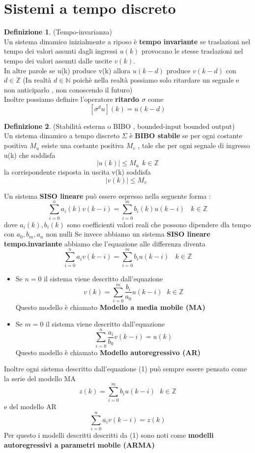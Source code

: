 \documentclass{article}
\theoremstyle{definition}
\newtheorem*{definizione}{Definizione}
\newcommand{\sisdiscr}{\sum_{i=0}^n a_iv(k-i)=\sum_{i=0}^m b_iu(k-i) \ \ \ \ k \in \mathbb{Z}}
\begin{document}
	\section{Sistemi a tempo discreto}
	\begin{definizione}(Tempo-invarianza)\\
		Un sistema dinamico inizialmente a riposo è \textbf{tempo invariante} se traslazioni nel tempo dei valori assunti dagli ingressi $u(k)$ provocano le stesse traslazioni nel tempo dei valori assunti dalle uscite $v(k)$.\\
		In altre parole se u(k) produce v(k) allora $u(k-d)$ produce $v(k-d)$ con $d \in \mathbb{Z}$ (In realtà $d \in \mathbb{N}$ poichè nella realtà possiamo solo ritardare un segnale e non anticiparlo , non conoscendo il futuro)\\
		Inoltre possiamo definire l'operatore \textbf{ritardo $\sigma$ } come 
		$$[\sigma^d u](k)=u(k-d)$$
			\end{definizione}
	\begin{definizione}(Stabilità esterna o BIBO , bounded-input bounded output)\\
		Un sistema dinamico a tempo discreto $\Sigma$ è \textbf{BIBO stabile }se per ogni costante positiva $M_u$ esiste una costante positiva $M_v$ , tale che per ogni segnale di ingresso u(k) che soddisfa 
		$$|u(k)|\leq M_u \ \  k \in \mathbb{Z}$$
		la corrispondente risposta in uscita v(k) soddisfa
		$$|v(k)|\leq M_v \ \  \textbf{} $$
	\end{definizione}
	Un sistema \textbf{SISO lineare} può essere espresso nella seguente forma : 
	$$\sum_{i=0}^n a_i(k)v(k-i)=\sum_{i=0}^m b_i(k)u(k-i) \ \ \ \ k \in \mathbb{Z}$$
	dove $a_i(k),b_i(k)$ sono coefficienti  valori reali che possono dipendere dla tempo con $a_0,b_m,a_n$ non nulli
	Se invece abbiamo un sistema \textbf{SISO lineare tempo.invariante} abbiamo che l'equazione alle differenza diventa 
	\begin{equation}
		\sisdiscr
	\end{equation}
	\begin{itemize}
		\item Se $n=0$ il sistema viene descritto dall'equazione 
		$$v(k)=\sum_{i=0}^{m}\frac{b_i}{a_0}u(k-i)  \ \ \ k \in \mathbb{Z}$$
		Questo modello è chiamato \textbf{Modello a media mobile (MA)}
		\item Se $m=0$ il sistema viene descritto dall'equazione
		$$\sum_{i=0}^{n}\frac{a_i}{b_0}v(k-i)=u(k)$$
		Questo modello è chiamato \textbf{Modello autoregressivo (AR)}
	\end{itemize}
	Inoltre ogni sistema descritto dall'equazione (1) può sempre essere pensato come la serie del modello MA 
	$$z(k)=\sum_{i=0}^{m}b_i u(k-i) \ \ \ k \in \mathbb{Z}$$
	e del modello AR
	$$\sum_{i=0}^{n}a_iv(k-i)=z(k)$$
	Per questo i modelli descritti descritti  da (1) sono noti come \textbf{modelli autoregressivi a parametri mobile (ARMA)}
\end{document}
